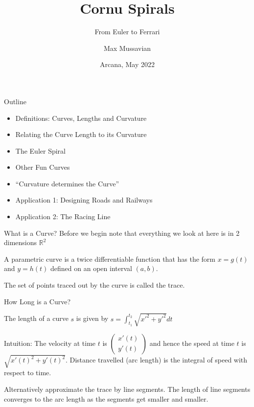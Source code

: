 \documentclass{beamer}
\title{Cornu Spirals}
\subtitle{From Euler to Ferrari}
\author{Max Mussavian}
\date[2022]{Arcana, May 2022}
\begin{document}
\begin{frame}[plain]
    \maketitle
\end{frame}
\begin{frame}{Outline}
	\begin{itemize}
		\item Definitions: Curves, Lengths and Curvature
		\item Relating the Curve Length to its Curvature
		\item The Euler Spiral
		\item Other Fun Curves
		\item ``Curvature determines the Curve''
		\item Application 1: Designing Roads and Railways
		\item Application 2: The Racing Line
	\end{itemize}
\end{frame}

\begin{frame}{What is a Curve?}
	Before we begin note that everything we look at here is in 2 dimensions $\mathbb{R}^2$
	\begin{definition}
		A parametric curve is a twice differentiable function that has the form
		$x = g(t)$ and $y=h(t)$ defined on an open interval $(a, b)$.
		
		The set of points traced out by the curve is called the trace.
	\end{definition}
\end{frame}

\begin{frame}{How Long is a Curve?}
	\begin{definition}
		The length of a curve $s$ is given by
		$s = \int_{t_1}^{t_2} \sqrt{x'^2+y'^2}dt$
	\end{definition}
	Intuition: The velocity at time $t$ is $\left( \begin{array}{c}
		x'(t)\\
		y'(t)
	\end{array} \right)$ and hence the speed at time $t$ is $\sqrt{x'(t)^2+y'(t)^2}$. Distance travelled (arc length) is the integral of speed with respect to time. 

	Alternatively approximate the trace by line segments. The length of line segments converges to the arc length as the segments get smaller and smaller.
\end{frame}
\end{document}
